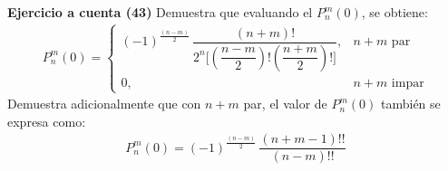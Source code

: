 \noindent
\textbf{Ejercicio a cuenta (43)} Demuestra que evaluando el $P_{n}^{m}(0)$, se obtiene:
\begin{align*}
P_{n}^{m} (0) = \begin{cases}
(-1)^{\frac{(n-m)}{2}} \, \dfrac{(n + m)!}{2^{n} \bigg[ \left( \dfrac{n - m}{2} \right)! \left( \dfrac{n + m}{2} \right)! \bigg]}, & n + m \mbox{ par} \\
0, & n + m \mbox{ impar}
\end{cases}
\end{align*}
Demuestra adicionalmente que con $n + m$ par, el valor de $P_{n}^{m}(0)$ también se expresa como:
\begin{align*}
P_{n}^{m}(0) = (-1)^{\frac{(n-m)}{2}} \, \dfrac{(n + m - 1)!!}{(n - m)!!}
\end{align*}

